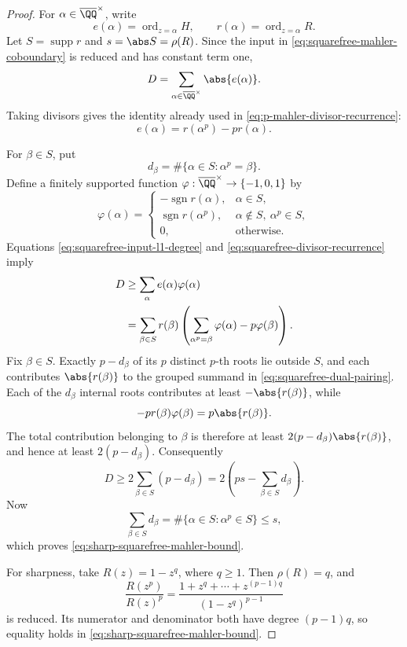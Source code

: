 \begin{proof}
For \(\alpha\in\overline{\QQ}^{\times}\), write
\[
 e(\alpha)=\operatorname{ord}_{z=\alpha}H,
 \qquad
 r(\alpha)=\operatorname{ord}_{z=\alpha}R.
\]
Let \(S=\operatorname{supp}r\) and \(s=\abs S=\rho(R)\).  Since the input
in \eqref{eq:squarefree-mahler-coboundary} is reduced and has constant term
one,
\begin{equation}\label{eq:squarefree-input-l1-degree}
 D=\sum_{\alpha\in\overline{\QQ}^{\times}}\abs{e(\alpha)}.
\end{equation}
Taking divisors gives the identity already used in
\eqref{eq:p-mahler-divisor-recurrence}:
\begin{equation}\label{eq:squarefree-divisor-recurrence}
 e(\alpha)=r(\alpha^p)-p r(\alpha).
\end{equation}

For \(\beta\in S\), put
\[
 d_\beta=\#\{\alpha\in S:\alpha^p=\beta\}.
\]
Define a finitely supported function
\(\varphi:\overline{\QQ}^{\times}\to\{-1,0,1\}\) by
\[
 \varphi(\alpha)=
 \begin{cases}
  -\operatorname{sgn}r(\alpha),&\alpha\in S,\\
  \operatorname{sgn}r(\alpha^p),&\alpha\notin S,
       \ \alpha^p\in S,\\
  0,&\text{otherwise}.
 \end{cases}
\]
Equations \eqref{eq:squarefree-input-l1-degree} and
\eqref{eq:squarefree-divisor-recurrence} imply
\begin{align}
 D
 &\ge \sum_\alpha e(\alpha)\varphi(\alpha)\notag\\
 &=\sum_{\beta\in S}r(\beta)
   \left(\sum_{\alpha^p=\beta}\varphi(\alpha)-p\varphi(\beta)\right).
 \label{eq:squarefree-dual-pairing}
\end{align}
Fix \(\beta\in S\).  Exactly \(p-d_\beta\) of its \(p\) distinct
\(p\)-th roots lie outside \(S\), and each contributes
\(\abs{r(\beta)}\) to the grouped summand in
\eqref{eq:squarefree-dual-pairing}.  Each of the \(d_\beta\) internal roots
contributes at least \(-\abs{r(\beta)}\), while
\[
 -p r(\beta)\varphi(\beta)=p\abs{r(\beta)}.
\]
The total contribution belonging to \(\beta\) is therefore at least
\(2(p-d_\beta)\abs{r(\beta)}\), and hence at least
\(2(p-d_\beta)\).  Consequently
\[
 D\ge2\sum_{\beta\in S}(p-d_\beta)
 =2\left(ps-\sum_{\beta\in S}d_\beta\right).
\]
Now
\[
 \sum_{\beta\in S}d_\beta
 =\#\{\alpha\in S:\alpha^p\in S\}\le s,
\]
which proves \eqref{eq:sharp-squarefree-mahler-bound}.

For sharpness, take \(R(z)=1-z^q\), where \(q\ge1\).  Then
\(\rho(R)=q\), and
\[
 \frac{R(z^p)}{R(z)^p}
 =\frac{1+z^q+\cdots+z^{(p-1)q}}{(1-z^q)^{p-1}}
\]
is reduced.  Its numerator and denominator both have degree
\((p-1)q\), so equality holds in
\eqref{eq:sharp-squarefree-mahler-bound}.
\end{proof}

